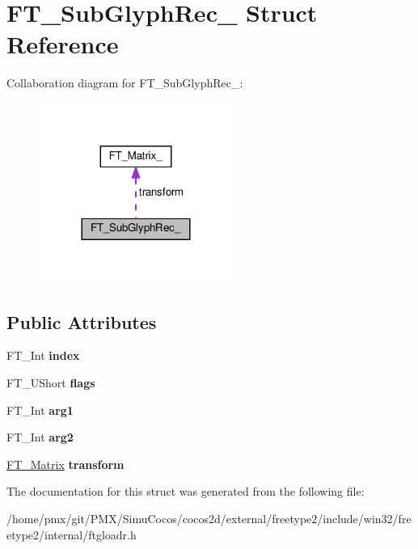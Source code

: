 \hypertarget{structFT__SubGlyphRec__}{}\section{F\+T\+\_\+\+Sub\+Glyph\+Rec\+\_\+ Struct Reference}
\label{structFT__SubGlyphRec__}


Collaboration diagram for F\+T\+\_\+\+Sub\+Glyph\+Rec\+\_\+\+:
\nopagebreak
\begin{figure}[H]
\begin{center}
\leavevmode
\includegraphics[width=180pt]{structFT__SubGlyphRec____coll__graph}
\end{center}
\end{figure}
\subsection*{Public Attributes}
\begin{DoxyCompactItemize}
\item 
\mbox{\label{structFT__SubGlyphRec___aa4febc2d867ff074ac116b068f372d3a}} 
F\+T\+\_\+\+Int {\bfseries index}
\item 
\mbox{\label{structFT__SubGlyphRec___a2d02aefc16061f7e039f76074518f6e5}} 
F\+T\+\_\+\+U\+Short {\bfseries flags}
\item 
\mbox{\label{structFT__SubGlyphRec___ad9f6b04ef50e1b39db90331e76f38206}} 
F\+T\+\_\+\+Int {\bfseries arg1}
\item 
\mbox{\label{structFT__SubGlyphRec___a0d27a8b473379cedeb061f9ecd7e97da}} 
F\+T\+\_\+\+Int {\bfseries arg2}
\item 
\mbox{\label{structFT__SubGlyphRec___a3c5fc1959a357c6c2b970ec2118d2683}} 
\hyperlink{structFT__Matrix__}{F\+T\+\_\+\+Matrix} {\bfseries transform}
\end{DoxyCompactItemize}


The documentation for this struct was generated from the following file\+:\begin{DoxyCompactItemize}
\item 
/home/pmx/git/\+P\+M\+X/\+Simu\+Cocos/cocos2d/external/freetype2/include/win32/freetype2/internal/ftgloadr.\+h\end{DoxyCompactItemize}
